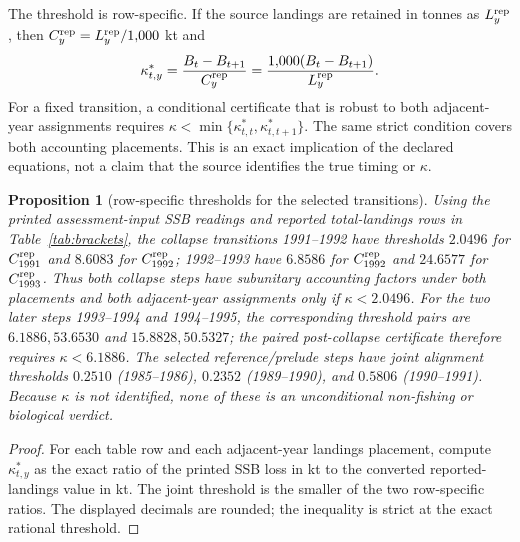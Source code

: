 \documentclass[10pt,twocolumn]{article}
\theoremstyle{plain}
\newtheorem{proposition}[theorem]{Proposition}
\theoremstyle{remark}
\begin{document}
The threshold is row-specific. If the source landings are retained in tonnes as \(L_y^{\rm rep}\), then \(C_y^{\rm rep}=L_y^{\rm rep}/1{,}000\) kt and
\[
\kappa^*_{t,y}=\frac{B_t-B_{t+1}}{C_y^{\rm rep}}=\frac{1{,}000(B_t-B_{t+1})}{L_y^{\rm rep}}.
\]
For a fixed transition, a conditional certificate that is robust to both adjacent-year assignments requires \(\kappa<\min\{\kappa^*_{t,t},\kappa^*_{t,t+1}\}\). The same strict condition covers both accounting placements. This is an exact implication of the declared equations, not a claim that the source identifies the true timing or \(\kappa\).

\begin{proposition}[row-specific thresholds for the selected transitions]\label{prop:brackets}
Using the printed assessment-input SSB readings and reported total-landings rows in Table~\ref{tab:brackets}, the collapse transitions 1991--1992 have thresholds \(2.0496\) for \(C_{1991}^{\rm rep}\) and \(8.6083\) for \(C_{1992}^{\rm rep}\); 1992--1993 have \(6.8586\) for \(C_{1992}^{\rm rep}\) and \(24.6577\) for \(C_{1993}^{\rm rep}\). Thus both collapse steps have subunitary accounting factors under both placements and both adjacent-year assignments only if \(\kappa<2.0496\). For the two later steps 1993--1994 and 1994--1995, the corresponding threshold pairs are \(6.1886,53.6530\) and \(15.8828,50.5327\); the paired post-collapse certificate therefore requires \(\kappa<6.1886\). The selected reference/prelude steps have joint alignment thresholds \(0.2510\) (1985--1986), \(0.2352\) (1989--1990), and \(0.5806\) (1990--1991). Because \(\kappa\) is not identified, none of these is an unconditional non-fishing or biological verdict.
\end{proposition}

\begin{proof}
For each table row and each adjacent-year landings placement, compute \(\kappa^*_{t,y}\) as the exact ratio of the printed SSB loss in kt to the converted reported-landings value in kt. The joint threshold is the smaller of the two row-specific ratios. The displayed decimals are rounded; the inequality is strict at the exact rational threshold.
\end{proof}
\end{document}
